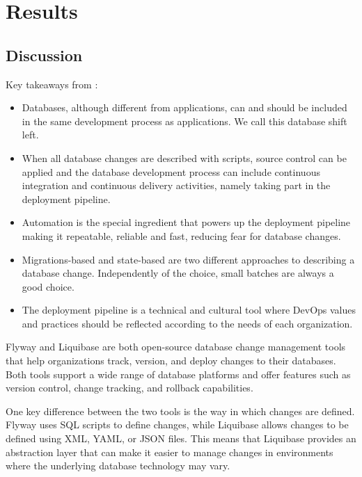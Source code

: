 
\chapter{Results}

\section{Discussion}
%

Key takeaways from \cite{Piairo2018}:\\

\begin{itemize}
	\item Databases, although different from applications, can and should be included in the same development process as applications. We call this database shift left.
	\item When all database changes are described with scripts, source control can be applied and the database development process can include continuous integration and continuous delivery activities, namely taking part in the deployment pipeline.
	\item Automation is the special ingredient that powers up the deployment pipeline making it repeatable, reliable and fast, reducing fear for database changes.
	\item Migrations-based and state-based are two different approaches to describing a database change. Independently of the choice, small batches are always a good choice.
	\item The deployment pipeline is a technical and cultural tool where DevOps values and practices should be reflected according to the needs of each organization.    
\end{itemize}


%
Flyway and Liquibase are both open-source database change management tools that help organizations track, version, and deploy changes to their databases. Both tools support a wide range of database platforms and offer features such as version control, change tracking, and rollback capabilities.

One key difference between the two tools is the way in which changes are defined. Flyway uses SQL scripts to define changes, while Liquibase allows changes to be defined using XML, YAML, or JSON files. This means that Liquibase provides an abstraction layer that can make it easier to manage changes in environments where the underlying database technology may vary.

